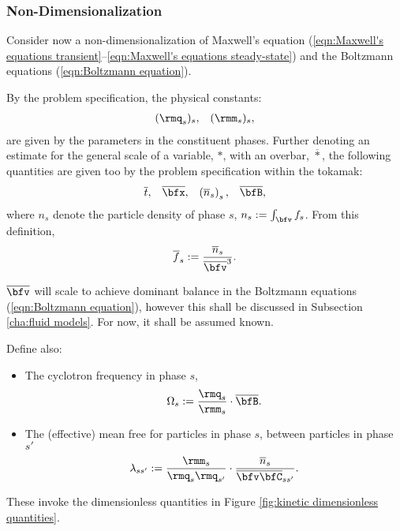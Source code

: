 \subsubsection{Non-Dimensionalization}
    Consider now a non-dimensionalization of Maxwell's equation (\ref{eqn:Maxwell's equations transient}--\ref{eqn:Maxwell's equations steady-state}) and the Boltzmann equations (\ref{eqn:Boltzmann equation}).
    
    By the problem specification, the physical constants:
    \begin{align}
        (\rmq_{s})_{s},  &&
        (\rmm_{s})_{s},
    \end{align}
    are given by the parameters in the constituent phases. Further denoting an estimate for the general scale of a variable, $*$, with an overbar, $\overline{*}$, the following quantities are given too by the problem specification within the tokamak:
    \begin{align}
        \overline{t},                       &&
        \overline{\bfx},                    &&
        \left(\overline{n}_{s}\right)_{s},  &&
        \overline{\bfB},
    \end{align}
    where $n_{s}$ denote the particle density of phase $s$, $n_{s}  :=  \int_{\bfv}f_{s}$. From this definition,
    \begin{equation}
        \overline{f}_{s}  :=  \frac{\overline{n}_{s}}{\overline{\bfv}^{3}}.
    \end{equation}

    $\overline{\bfv}$ will scale to achieve dominant balance in the Boltzmann equations (\ref{eqn:Boltzmann equation}), however this shall be discussed in Subsection \ref{cha:fluid models}. For now, it shall be assumed known.

    Define also:
    \begin{itemize}
        \item  The cyclotron frequency in phase $s$,
        \begin{equation}
            \Omega_{s}  :=  \frac{\rmq_{s}}{\rmm_{s}}\cdot\overline{\bfB}.
        \end{equation}
        \item  The (effective) mean free for particles in phase $s$, between particles in phase $s'$
        \begin{equation}
            \lambda_{ss'}  :=  \frac{\rmm_{s}}{\rmq_{s}\rmq_{s'}}\cdot\frac{\overline{n}_{s}}{\overline{\bfv}\overline{\bfC}_{ss'}}.
        \end{equation}
    \end{itemize}
    These invoke the dimensionless quantities in Figure \ref{fig:kinetic dimensionless quantities}.

